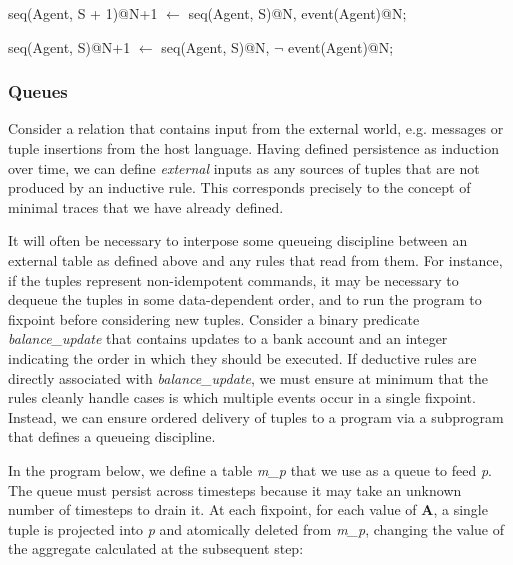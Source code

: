 \begin{Dedalus}
seq(Agent, S + 1)@N+1 \(\leftarrow\)
  seq(Agent, S)@N, 
  event(Agent)@N; 
  
seq(Agent, S)@N+1 \(\leftarrow\) 
  seq(Agent, S)@N, 
  \(\lnot\) event(Agent)@N;
\end{Dedalus}

\subsubsection{Queues}


Consider a relation that contains input from the external world, e.g. messages or tuple insertions from the host language.  
Having defined persistence as induction over time, we can define \emph{external} inputs as any sources of tuples 
that are not produced by an inductive rule.  This corresponds precisely to the concept of minimal traces that we have already
defined.

It will often be necessary to interpose some queueing discipline between an external table as defined above and any
rules that read from them.  For instance, if the tuples represent non-idempotent commands, it may be necessary to dequeue
the tuples in some data-dependent order, and to run the program to fixpoint before considering new tuples.  Consider a binary
predicate \emph{balance\_update} that contains updates to a bank account and an integer indicating the order in which they
should be executed.  If deductive rules are directly associated with \emph{balance\_update}, we must ensure at minimum that
the rules cleanly handle cases is which multiple events occur in a single fixpoint.  Instead, we can ensure ordered delivery 
of tuples to a program via a subprogram that defines a queueing discipline.

In the program below, we define a table \emph{m\_p} that we use as a queue to feed \emph{p}.  The queue must persist across
timesteps because it may take an unknown number of timesteps to drain it.  At each fixpoint, for each value of \textbf{A}, a single
tuple is projected into \emph{p} and atomically deleted from \emph{m\_p}, changing the value of the aggregate calculated at the
subsequent step:


